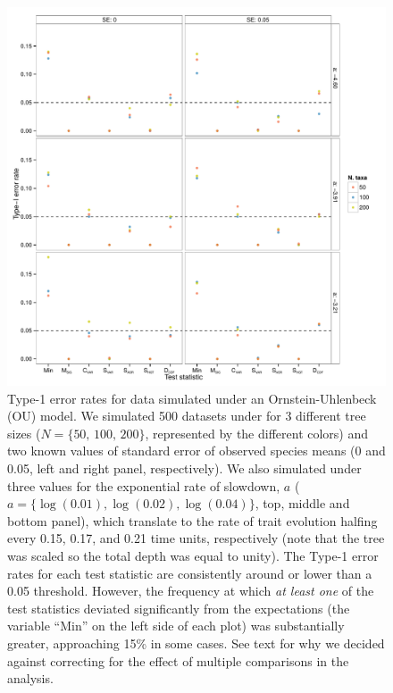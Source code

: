 \documentclass[12pt,twoside]{article}
\begin{document}
\begin{figure}[p]
  \centering
  \includegraphics[width=\textwidth]{figs/eb-sim-res}
  \caption[Type-1 error rates for EB simulations]{Type-1 error rates for data simulated under an Ornstein-Uhlenbeck (OU) model. We simulated 500 datasets under for 3 different tree sizes ($N=\lbrace \text{50, 100, 200} \rbrace$, represented by the different colors) and two known values of standard error of observed species means (0 and 0.05, left and right panel, respectively). We also simulated under three values for the exponential rate of slowdown, $a$ ($a=\lbrace \log(\text{0.01}),\log(\text{0.02}),\log(\text{0.04}) \rbrace$, top, middle and bottom panel), which translate to the rate of trait evolution halfing every 0.15, 0.17, and 0.21 time units, respectively (note that the tree was scaled so the total depth was equal to unity).  The Type-1 error rates for each test statistic are consistently around or lower than a 0.05 threshold. However, the frequency at which \emph{at least one} of the test statistics deviated significantly from the expectations (the variable ``Min'' on the left side of each plot) was substantially greater, approaching 15\% in some cases. See text for why we decided against correcting for the effect of multiple comparisons in the analysis.}
  \label{fig:eb-sim}
\end{figure}
\end{document}
